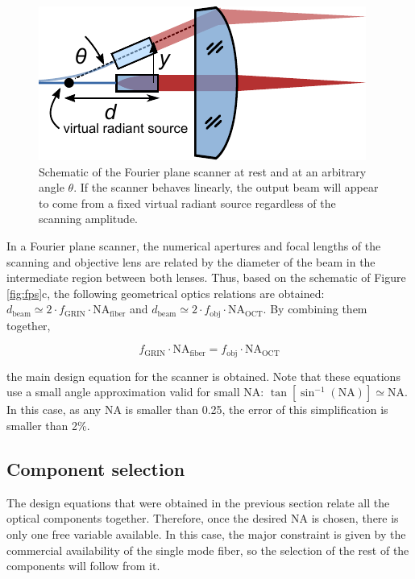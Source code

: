 \begin{figure}[h!]\centering
      \includegraphics{figures/30_DesignSimulation/Mechanical/radiant.pdf}
      \caption{Schematic of the Fourier plane scanner at rest and at an arbitrary angle $\theta$. If the scanner behaves linearly, the output beam will appear to come from a fixed virtual radiant source regardless of the scanning amplitude.}
      \label{fig:radiant}
\end{figure}


In a Fourier plane scanner, the numerical apertures and focal lengths of the scanning and objective lens are related by the diameter of the beam in the intermediate region between both lenses. Thus, based on the schematic of Figure \ref{fig:fps}c, the following geometrical optics relations are obtained: $d_\mathrm{beam} \simeq 2\cdot f_\mathrm{GRIN}\cdot \mathrm{NA}_\mathrm{fiber}$ and $d_\mathrm{beam} \simeq 2 \cdot f_\mathrm{obj}\cdot \mathrm{NA}_\mathrm{OCT}$. By combining them together,

\begin{equation}
f_\mathrm{GRIN} \cdot \mathrm{NA}_\mathrm{fiber} = f_\mathrm{obj} \cdot \mathrm{NA}_\mathrm{OCT}
\label{eq:fpsNA}
\end{equation}

the main design equation for the scanner is obtained. Note that these equations use a small angle approximation valid for small NA:  $\tan[\sin^{-1}(\mathrm{NA})] \simeq \mathrm{NA} $. In this case, as any NA is smaller than 0.25, the error of this simplification is smaller than 2\%.

\subsection{Component selection}
The design equations that were obtained in the previous section relate all the optical components together. Therefore, once the desired NA is chosen, there is only one free variable available. In this case, the major constraint is given by the commercial availability of the single mode fiber, so the selection of the rest of the components will follow from it.

